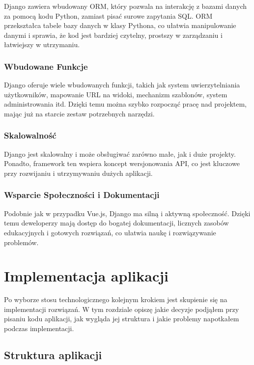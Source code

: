 Django zawiera wbudowany ORM, który pozwala na interakcję z bazami danych za pomocą kodu Python, zamiast pisać surowe zapytania SQL. ORM przekształca tabele bazy danych w klasy Pythona, co ułatwia manipulowanie danymi i sprawia, że kod jest bardziej czytelny, prostszy w zarządzaniu i łatwiejszy w utrzymaniu.

\subsubsection*{Wbudowane Funkcje}

Django oferuje wiele wbudowanych funkcji, takich jak system uwierzytelniania użytkowników, mapowanie URL na widoki, mechanizm szablonów, system administrowania itd. Dzięki temu można szybko rozpocząć pracę nad projektem, mając już na starcie zestaw potrzebnych narzędzi.


\subsubsection*{Skalowalność}

Django jest skalowalny i może obsługiwać zarówno małe, jak i duże projekty. Ponadto, framework ten wspiera koncept wersjonowania API, co jest kluczowe przy rozwijaniu i utrzymywaniu dużych aplikacji.

\subsubsection*{Wsparcie Społeczności i Dokumentacji}

Podobnie jak w przypadku Vue.js, Django ma silną i aktywną społeczność. Dzięki temu deweloperzy mają dostęp do bogatej dokumentacji, licznych zasobów edukacyjnych i gotowych rozwiązań, co ułatwia naukę i rozwiązywanie problemów.


\section{Implementacja aplikacji}

Po wyborze stosu technologicznego kolejnym krokiem jest skupienie się na implementacji rozwiązań. W tym rozdziale opiszę jakie decyzje podjąłem przy pisaniu kodu aplikacji, jak wygląda jej struktura i jakie problemy napotkałem podczas implementacji.

\subsection*{Struktura aplikacji}

